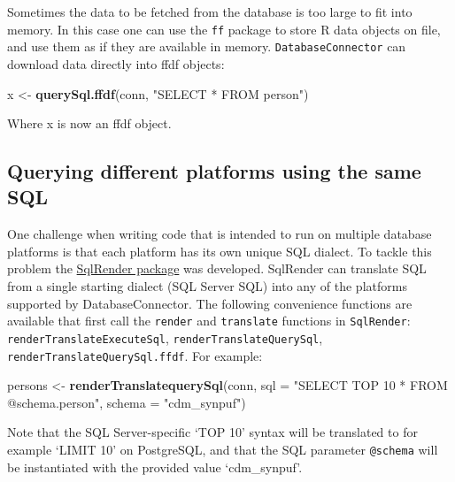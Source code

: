 \documentclass[]{article}
\newenvironment{Shaded}{\begin{snugshade}}{\end{snugshade}}
\newcommand{\DataTypeTok}[1]{\textcolor[rgb]{0.13,0.29,0.53}{#1}}
\newcommand{\KeywordTok}[1]{\textcolor[rgb]{0.13,0.29,0.53}{\textbf{#1}}}
\newcommand{\NormalTok}[1]{#1}
\newcommand{\StringTok}[1]{\textcolor[rgb]{0.31,0.60,0.02}{#1}}
\begin{document}
Sometimes the data to be fetched from the database is too large to fit
into memory. In this case one can use the \texttt{ff} package to store R
data objects on file, and use them as if they are available in memory.
\texttt{DatabaseConnector} can download data directly into ffdf objects:

\begin{Shaded}
\begin{Highlighting}[]
\NormalTok{x <-}\StringTok{ }\KeywordTok{querySql.ffdf}\NormalTok{(conn, }\StringTok{"SELECT * FROM person"}\NormalTok{)}
\end{Highlighting}
\end{Shaded}

Where x is now an ffdf object.

\hypertarget{querying-different-platforms-using-the-same-sql}{%
\subsection{Querying different platforms using the same
SQL}\label{querying-different-platforms-using-the-same-sql}}

One challenge when writing code that is intended to run on multiple
database platforms is that each platform has its own unique SQL dialect.
To tackle this problem the
\href{https://ohdsi.github.io/SqlRender/}{SqlRender package} was
developed. SqlRender can translate SQL from a single starting dialect
(SQL Server SQL) into any of the platforms supported by
DatabaseConnector. The following convenience functions are available
that first call the \texttt{render} and \texttt{translate} functions in
\texttt{SqlRender}: \texttt{renderTranslateExecuteSql},
\texttt{renderTranslateQuerySql}, \texttt{renderTranslateQuerySql.ffdf}.
For example:

\begin{Shaded}
\begin{Highlighting}[]
\NormalTok{persons <-}\StringTok{ }\KeywordTok{renderTranslatequerySql}\NormalTok{(conn, }
                                   \DataTypeTok{sql =} \StringTok{"SELECT TOP 10 * FROM @schema.person"}\NormalTok{,}
                                   \DataTypeTok{schema =} \StringTok{"cdm_synpuf"}\NormalTok{)}
\end{Highlighting}
\end{Shaded}

Note that the SQL Server-specific `TOP 10' syntax will be translated to
for example `LIMIT 10' on PostgreSQL, and that the SQL parameter
\texttt{@schema} will be instantiated with the provided value
`cdm\_synpuf'.
\end{document}
